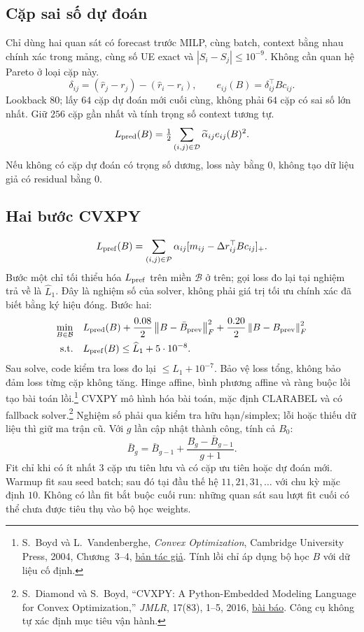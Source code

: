 \documentclass[11pt,a4paper]{article}
\newcommand{\norm}[1]{\left\lVert#1\right\rVert}
\begin{document}
\subsection{Cặp sai số dự đoán}
Chỉ dùng hai quan sát có forecast trước MILP, cùng batch, context bằng nhau chính xác trong mảng, cùng số UE exact và $|S_i-S_j|\le10^{-9}$.
Không cần quan hệ Pareto ở loại cặp này.
\[
\delta_{ij}=(\widehat r_j-r_j)-(\widehat r_i-r_i),\qquad
e_{ij}(B)=\delta_{ij}^\top Bc_{ij}.
\]
Lookback $80$; lấy $64$ cặp dự đoán mới cuối cùng, không phải $64$ cặp có sai số lớn nhất. Giữ $256$ cặp gần nhất và tính trọng số context tương tự.
\[
L_{\rm pred}(B)=\tfrac12\sum_{(i,j)\in\mathcal D}\widetilde\alpha_{ij}e_{ij}(B)^2.
\]
Nếu không có cặp dự đoán có trọng số dương, loss này bằng $0$, không tạo dữ liệu giả có residual bằng $0$.

\subsection{Hai bước CVXPY}
\[
L_{\rm pref}(B)=\sum_{(i,j)\in\mathcal P}\alpha_{ij}
[m_{ij}-\Delta r_{ij}^\top Bc_{ij}]_+.
\]
Bước một chỉ tối thiểu hóa $L_{\rm pref}$ trên miền $\mathcal B$ ở trên; gọi loss đo lại tại nghiệm trả về là $\widehat L_1$.
Đây là nghiệm số của solver, không phải giá trị tối ưu chính xác đã biết bằng ký hiệu đóng.
Bước hai:
\[
\begin{aligned}
\min_{B\in\mathcal B}\quad&L_{\rm pred}(B)+\frac{0.08}{2}\norm{B-\bar B_{\rm prev}}_F^2
+\frac{0.20}{2}\norm{B-B_{\rm prev}}_F^2\\
\text{s.t.}\quad&L_{\rm pref}(B)\le\widehat L_1+5\cdot10^{-8}.
\end{aligned}
\]
Sau solve, code kiểm tra loss đo lại $\le\widehat L_1+10^{-7}$. Bảo vệ loss tổng, không bảo đảm loss từng cặp không tăng.
Hinge affine, bình phương affine và ràng buộc lồi tạo bài toán lồi.\footnote{S.~Boyd và L.~Vandenberghe, \emph{Convex Optimization}, Cambridge University Press, 2004, Chương~3--4, \href{https://stanford.edu/~boyd/cvxbook/}{bản tác giả}. Tính lồi chỉ áp dụng bộ học $B$ với dữ liệu cố định.}
CVXPY mô hình hóa bài toán, mặc định CLARABEL và có fallback solver.\footnote{S.~Diamond và S.~Boyd, ``CVXPY: A Python-Embedded Modeling Language for Convex Optimization,'' \emph{JMLR}, 17(83), 1--5, 2016, \href{https://www.jmlr.org/papers/v17/15-408.html}{bài báo}. Công cụ không tự xác định mục tiêu vận hành.}
Nghiệm số phải qua kiểm tra hữu hạn/simplex; lỗi hoặc thiếu dữ liệu thì giữ ma trận cũ.
Với $g$ lần cập nhật thành công, tính cả $B_0$:
\[
\bar B_g=\bar B_{g-1}+\frac{B_g-\bar B_{g-1}}{g+1}.
\]
Fit chỉ khi có ít nhất $3$ cặp ưu tiên lưu và có cặp ưu tiên hoặc dự đoán mới.
Warmup fit sau seed batch; sau đó tại đầu thế hệ $11,21,31,\ldots$ với chu kỳ mặc định $10$.
Không có lần fit bắt buộc cuối run: những quan sát sau lượt fit cuối có thể chưa được tiêu thụ vào bộ học weights.
\end{document}
